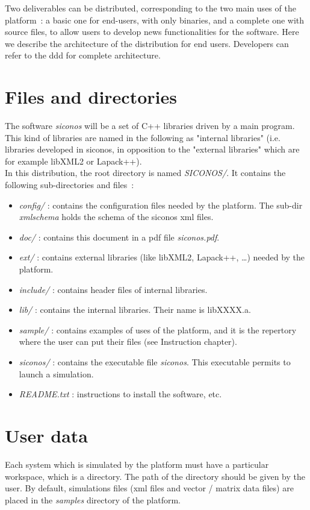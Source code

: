 Two deliverables can be distributed, corresponding to the two main uses of the platform~: a basic one for end-users, with only binaries, and a complete one with source files, to allow users to develop news functionalities for the software.
Here we describe the architecture of the distribution for end users. Developers can refer to the \ac{ddd} for complete architecture.

\section{Files and directories}
The software \textit{siconos} will be a set of C++ libraries driven by a main program. This kind of libraries are named in the following as "internal libraries" (i.e. libraries developed in \ac{siconos}, in opposition to the "external libraries" which are for example libXML2 or Lapack++). \\

In this distribution, the root directory is named \textit{SICONOS/}. It contains the following sub-directories and files~: 
\begin{itemize}

\item  \textit{config/} : contains the configuration files needed by the platform. The sub-dir \textit{xmlschema} holds the schema of the \ac{siconos} \ac{xml} files.

\item  \textit{doc/} : contains this document in a pdf file \textit{siconos.pdf}. 

\item \textit{ext/} : contains external libraries (like libXML2, Lapack++, \dots) needed by the platform. %

\item \textit{include/} : contains header files of internal libraries.

\item \textit{lib/} : contains the internal libraries. Their name is libXXXX.a.

\item \textit{sample/} : contains examples of uses of the platform, and it is the repertory where the user can put their files (see Instruction chapter).

\item \textit{siconos/} : contains the executable file \textit{siconos}. This executable permits to launch a simulation.

\item \textit{README.txt} : instructions to install the software, etc.

\end{itemize}


\section{User data}
Each system which is simulated by the platform must have a particular workspace, which is a directory. The path of the directory should be given by the user. By default, simulations files (\ac{xml} files and vector / matrix data files) are placed in the \textit{samples} directory of the platform.
